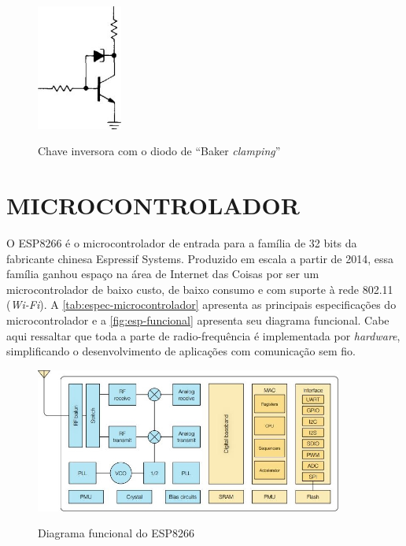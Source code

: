 \begin{figure}[H]
    \centering
    \caption{Chave inversora com o diodo de ``Baker \emph{clamping}''}
    \includegraphics[width=0.25\textwidth]{./dados/figuras/bakerclamp}
    \label{fig:bakerclamp}
\end{figure}

\section{MICROCONTROLADOR}
\label{sec:microcontrolador}

O ESP8266 é o microcontrolador de entrada para a família de 32 bits da fabricante chinesa Espressif Systems. Produzido em escala a partir de 2014, essa família ganhou espaço na área de Internet das Coisas por ser um microcontrolador de baixo custo, de baixo consumo e com suporte à rede 802.11 (\emph{Wi-Fi}). A \autoref{tab:espec-microcontrolador} apresenta as principais especificações do microcontrolador e a \autoref{fig:esp-funcional} apresenta seu diagrama funcional. Cabe aqui ressaltar que toda a parte de radio-frequência é implementada por \emph{hardware}, simplificando o desenvolvimento de aplicações com comunicação sem fio.



\begin{figure}[!htb]
    \centering
    \caption{Diagrama funcional do ESP8266}
    \includegraphics[width=0.9\textwidth]{./dados/figuras/esp-funcional}
    \label{fig:esp-funcional}
\end{figure}


